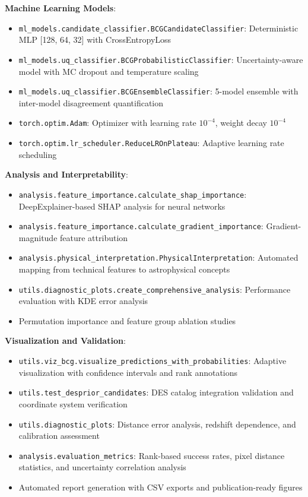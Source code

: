 \documentclass[twocolumn,10pt]{aastex631}
\begin{document}
\textbf{Machine Learning Models}:
\begin{itemize}
\item \texttt{ml\_models.candidate\_classifier.BCGCandidateClassifier}: Deterministic MLP [128, 64, 32] with CrossEntropyLoss
\item \texttt{ml\_models.uq\_classifier.BCGProbabilisticClassifier}: Uncertainty-aware model with MC dropout and temperature scaling
\item \texttt{ml\_models.uq\_classifier.BCGEnsembleClassifier}: 5-model ensemble with inter-model disagreement quantification
\item \texttt{torch.optim.Adam}: Optimizer with learning rate $10^{-4}$, weight decay $10^{-4}$
\item \texttt{torch.optim.lr\_scheduler.ReduceLROnPlateau}: Adaptive learning rate scheduling
\end{itemize}

\textbf{Analysis and Interpretability}:
\begin{itemize}
\item \texttt{analysis.feature\_importance.calculate\_shap\_importance}: DeepExplainer-based SHAP analysis for neural networks
\item \texttt{analysis.feature\_importance.calculate\_gradient\_importance}: Gradient-magnitude feature attribution
\item \texttt{analysis.physical\_interpretation.PhysicalInterpretation}: Automated mapping from technical features to astrophysical concepts
\item \texttt{utils.diagnostic\_plots.create\_comprehensive\_analysis}: Performance evaluation with KDE error analysis
\item Permutation importance and feature group ablation studies
\end{itemize}

\textbf{Visualization and Validation}:
\begin{itemize}
\item \texttt{utils.viz\_bcg.visualize\_predictions\_with\_probabilities}: Adaptive visualization with confidence intervals and rank annotations
\item \texttt{utils.test\_desprior\_candidates}: DES catalog integration validation and coordinate system verification
\item \texttt{utils.diagnostic\_plots}: Distance error analysis, redshift dependence, and calibration assessment
\item \texttt{analysis.evaluation\_metrics}: Rank-based success rates, pixel distance statistics, and uncertainty correlation analysis
\item Automated report generation with CSV exports and publication-ready figures
\end{itemize}
\end{document}
